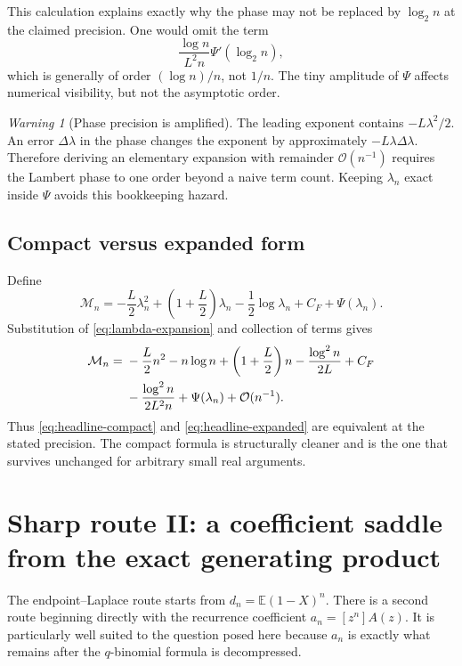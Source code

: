 \documentclass[11pt,oneside]{article}
\theoremstyle{definition}
\theoremstyle{remark}
\newtheorem{warning}[theorem]{Warning}
\newcommand{\E}{\mathbb E}
\newcommand{\bigO}{\mathcal O}
\begin{document}
This calculation explains exactly why the phase may not be replaced by $\log_2n$ at the
claimed precision.  One would omit the term
\begin{equation}
 \frac{\log n}{L^2n}\Psi'(\log_2n),                         \label{eq:missing-phase-term}
\end{equation}
which is generally of order $(\log n)/n$, not $1/n$.  The tiny amplitude of $\Psi$ affects
numerical visibility, but not the asymptotic order.

\begin{warning}[Phase precision is amplified]
The leading exponent contains $-L\lambda^2/2$.  An error $\Delta\lambda$ in the phase changes
the exponent by approximately $-L\lambda\Delta\lambda$.  Therefore deriving an elementary
expansion with remainder $\bigO(n^{-1})$ requires the Lambert phase to one order beyond a
naive term count.  Keeping $\lambda_n$ exact inside $\Psi$ avoids this bookkeeping hazard.
\end{warning}

\subsection{Compact versus expanded form}

Define
\begin{equation}
 \mathcal M_n=-\frac L2\lambda_n^2+
 \left(1+\frac L2\right)\lambda_n-\frac12\log\lambda_n
 +C_F+\Psi(\lambda_n).                                     \label{eq:Mn}
\end{equation}
Substitution of \eqref{eq:lambda-expansion} and collection of terms gives
\begin{align}
 \mathcal M_n={}&-\frac L2n^2-n\log n+
 \left(1+\frac L2\right)n-\frac{\log^2n}{2L}+C_F           \notag\\
 &-\frac{\log^2n}{2L^2n}+\Psi(\lambda_n)+\bigO(n^{-1}).   \label{eq:compact-to-expanded}
\end{align}
Thus \eqref{eq:headline-compact} and \eqref{eq:headline-expanded} are equivalent at the stated
precision.  The compact formula is structurally cleaner and is the one that survives
unchanged for arbitrary small real arguments.

\section{Sharp route II: a coefficient saddle from the exact generating product}
\label{sec:coefficient-saddle}

The endpoint--Laplace route starts from $d_n=\E(1-X)^n$.  There is a second route beginning
directly with the recurrence coefficient $a_n=[z^n]A(z)$.  It is particularly well suited to
the question posed here because $a_n$ is exactly what remains after the $q$-binomial formula
is decompressed.
\end{document}
